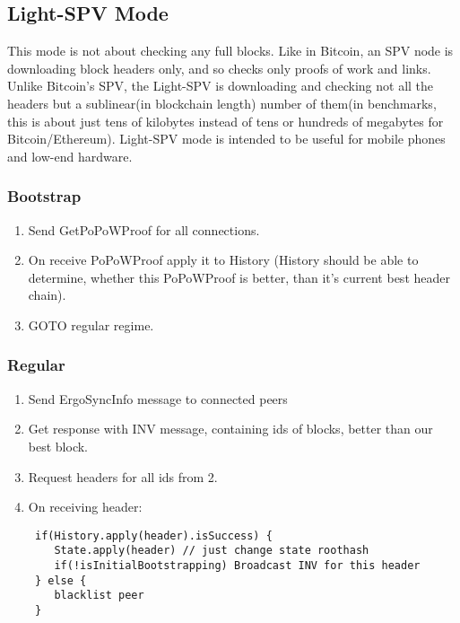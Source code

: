 \documentclass[]{report}   %
\begin{document}
\subsection{Light-SPV Mode}
This mode is not about checking any full blocks. Like in Bitcoin, an SPV node is downloading block headers only, and so checks only proofs of work and links. Unlike Bitcoin’s SPV, the Light-SPV is downloading and checking not all the headers but a sublinear(in blockchain length) number of them(in benchmarks, this is about just tens of kilobytes instead of tens or hundreds of megabytes for Bitcoin/Ethereum).
Light-SPV mode is intended to be useful for mobile phones and low-end hardware.
\subsubsection{Bootstrap}
\begin{enumerate}
\item Send GetPoPoWProof for all connections.
\item On receive PoPoWProof apply it to History (History should be able to determine, whether this PoPoWProof is better, than it's current best header chain).
\item GOTO regular regime.
\end{enumerate}
\subsubsection{Regular}
\begin{enumerate}
\item Send ErgoSyncInfo message to connected peers
\item Get response with INV message, containing ids of blocks, better than our best block.
\item Request headers for all ids from 2.
\item On receiving header:
\begin{verbatim}
 if(History.apply(header).isSuccess) {
    State.apply(header) // just change state roothash
    if(!isInitialBootstrapping) Broadcast INV for this header
 } else {
    blacklist peer
 }
\end{verbatim}
\end{enumerate}
\end{document}
